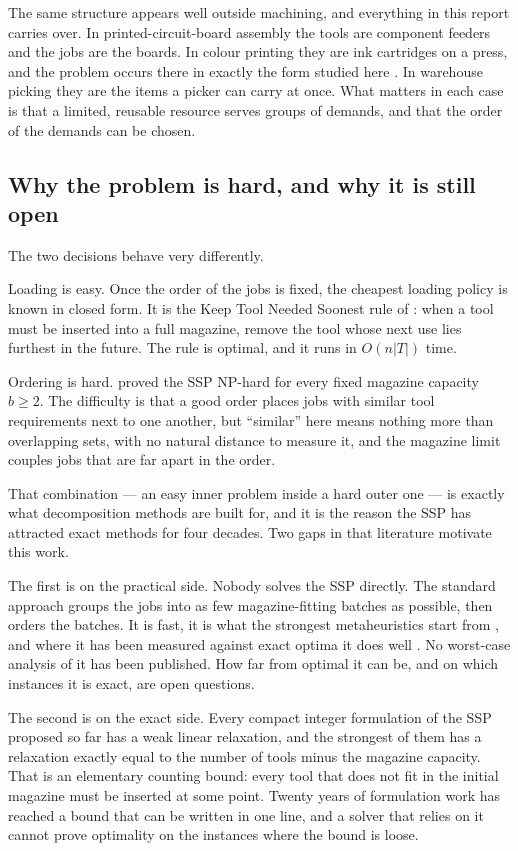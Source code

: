 The same structure appears well outside machining, and everything in this report
carries over. In printed-circuit-board assembly the tools are component feeders and
the jobs are the boards. In colour printing they are ink cartridges on a press, and
the problem occurs there in exactly the form studied here
\citep{Burger2015}. In warehouse picking they are the items a picker can carry at
once. What matters in each case is that a limited, reusable resource serves groups
of demands, and that the order of the demands can be chosen.

\subsection{Why the problem is hard, and why it is still open}\label{ssec:intro-why}

The two decisions behave very differently.

Loading is easy. Once the order of the jobs is fixed, the cheapest loading policy is
known in closed form. It is the Keep Tool Needed Soonest rule of \citet{Tang1988}:
when a tool must be inserted into a full magazine, remove the tool whose next use
lies furthest in the future. The rule is optimal, and it runs in
$O(n\lvert T\rvert)$ time.

Ordering is hard. \citet{Crama1994} proved the SSP NP-hard for every fixed magazine
capacity $b\ge2$. The difficulty is that a good order places jobs with similar tool
requirements next to one another, but ``similar'' here means nothing more than
overlapping sets, with no natural distance to measure it, and the magazine limit
couples jobs that are far apart in the order.

That combination --- an easy inner problem inside a hard outer one --- is exactly
what decomposition methods are built for, and it is the reason the SSP has attracted
exact methods for four decades. Two gaps in that literature motivate this work.

The first is on the practical side. Nobody solves the SSP directly. The standard
approach groups the jobs into as few magazine-fitting batches as possible, then
orders the batches. It is fast, it is what the strongest metaheuristics start from
\citep{Mecler2021}, and where it has been measured against exact optima it does
well \citep{Burger2015}. No worst-case analysis of it has been published. How far
from optimal it can be, and on which instances it is exact, are open questions.

The second is on the exact side. Every compact integer formulation of the SSP
proposed so far has a weak linear relaxation, and the strongest of them
\citep{daSilva2024} has a relaxation exactly equal to the number of tools minus the
magazine capacity. That is an elementary counting bound: every tool that does not
fit in the initial magazine must be inserted at some point. Twenty years of
formulation work has reached a bound that can be written in one line, and a solver
that relies on it cannot prove optimality on the instances where the bound is loose.

